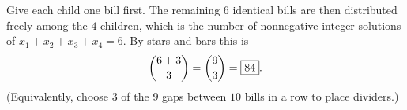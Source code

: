 Give each child one bill first. The remaining $6$ identical bills are then distributed freely among the $4$ children, which is the number of nonnegative integer solutions of $x_1+x_2+x_3+x_4=6$. By stars and bars this is
\[
\dbinom{6+3}{3}=\dbinom{9}{3}=\boxed{84}.
\]
(Equivalently, choose $3$ of the $9$ gaps between $10$ bills in a row to place dividers.)
